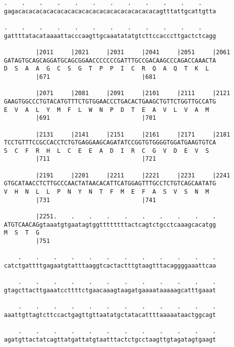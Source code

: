 \documentclass{article}
\begin{document}
\begin{Verbatim}
.    .    .    .    .    .    .    .    .    .    .    .    
gagacacacacacacacacacacacacacacacacacacacacagtttattgcattgtta
                                                            
.    .    .    .    .    .    .    .    .    .    .    .    
gattttatacataaaattacccaagttgcaaatatatgtcttccacccttgactctcagg
                                                            
         |2011     |2021     |2031     |2041     |2051     |2061
GATAGTGCAGCAGGATGCAGCGGAACCCCCCCGATTTGCCGACAAGCCCAGACCAAACTA
D  S  A  A  G  C  S  G  T  P  P  I  C  R  Q  A  Q  T  K  L  
         |671                          |681                 
  
         |2071     |2081     |2091     |2101     |2111     |2121
GAAGTGGCCCTGTACATGTTTCTGTGGAACCCTGACACTGAAGCTGTTCTGGTTGCCATG
E  V  A  L  Y  M  F  L  W  N  P  D  T  E  A  V  L  V  A  M  
         |691                          |701                 
  
         |2131     |2141     |2151     |2161     |2171     |2181
TCCTGTTTCCGCCACCTCTGTGAGGAAGCAGATATCCGGTGTGGGGTGGATGAAGTGTCA
S  C  F  R  H  L  C  E  E  A  D  I  R  C  G  V  D  E  V  S  
         |711                          |721                 
  
         |2191     |2201     |2211     |2221     |2231     |2241
GTGCATAACCTCTTGCCCAACTATAACACATTCATGGAGTTTGCCTCTGTCAGCAATATG
V  H  N  L  L  P  N  Y  N  T  F  M  E  F  A  S  V  S  N  M  
         |731                          |741                 
  
         |2251.    .    .    .    .    .    .    .    .    .
ATGTCAACAGgtaaatgtgaatagtggttttttttactcagtctgcctcaaagcacatgg
M  S  T  G                                                  
         |751                                               
  
    .    .    .    .    .    .    .    .    .    .    .    .
catctgattttgagaatgtatttaaggtcactactttgtaagtttacaggggaaattcaa
                                                            
    .    .    .    .    .    .    .    .    .    .    .    .
gtagcttacttgaaatccttttctgaacaaagtaagatgaaaataaaaagcatttgaaat
                                                            
    .    .    .    .    .    .    .    .    .    .    .    .
aaattgttagtcttccactgagttgttaatatgctatacattttaaaaataactggcagt
                                                            
    .    .    .    .    .    .    .    .    .    .    .    .
agatgttactatcagttatgattatgtaatttactctgcctaagttgtagatagtgaagt
                                                            

\end{Verbatim}
\end{document}
